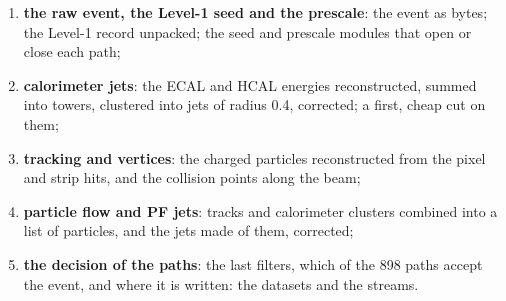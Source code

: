 \begin{enumerate}
\item \textbf{the raw event, the Level-1 seed and the prescale}: the event as bytes; the Level-1 record unpacked; the
seed and prescale modules that open or close each path;
\item \textbf{calorimeter jets}: the ECAL and HCAL energies reconstructed, summed into towers, clustered into jets of
radius 0.4, corrected; a first, cheap cut on them;
\item \textbf{tracking and vertices}: the charged particles reconstructed from the pixel and strip hits, and the
collision points along the beam;
\item \textbf{particle flow and PF jets}: tracks and calorimeter clusters combined into a list of particles, and the
jets made of them, corrected;
\item \textbf{the decision of the paths}: the last filters, which of the 898 paths accept the event, and where it is
written: the datasets and the streams.
\end{enumerate}

